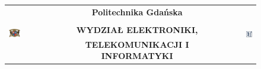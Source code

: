 \sffamily

\begin{figure}
\begin{center}
\begin{tabular}[t]{l c r}
	\multirow{4}{*}{
		\ifpdf
			\includegraphics[width=0.22\textwidth]{images/logo_pg.png}
		\fi
	}
	& \Large\textbf{Politechnika Gdańska} &
	\multirow{4}{*}{
		\ifpdf
			\includegraphics[width=0.16\textwidth]{images//logo_eti.png}
		\fi
	} \\
&  & \\
& \textsc {\bf WYDZIAŁ ELEKTRONIKI,} & \\ 
& \textsc {\bf TELEKOMUNIKACJI I INFORMATYKI} & \\ 
\end{tabular}
\end{center}
\end{figure}


